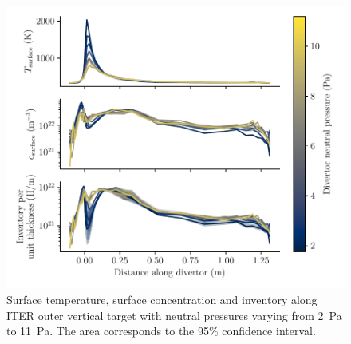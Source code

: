 

\begin{figure}[h!]
    \centering
    \includegraphics[width=\linewidth]{Figures/divertor/ITER/inventory_along_outer_divertor.pdf}
    \caption{Surface temperature, surface concentration and inventory along ITER outer vertical target with neutral pressures varying from \SI{2}{Pa} to \SI{11}{Pa}. The area corresponds to the 95\% confidence interval.}
    \label{fig: distrib outer target}
\end{figure}


